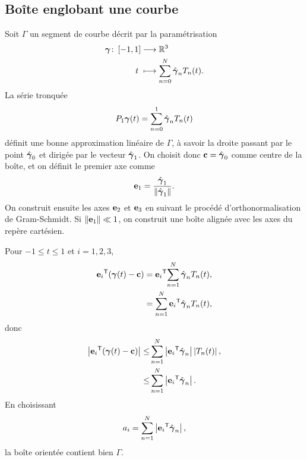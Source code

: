 \subsection{Boîte englobant une courbe}
Soit $\Gamma$ un segment de courbe décrit par la paramétrisation 
\begin{align}
  \boldsymbol{\gamma} \colon \left[ -1, 1 \right] &\longrightarrow \mathbb{R}^3 \nonumber \\
  t\; &\longmapsto \sum_{n=0}^{N} \hat{\boldsymbol{\gamma}}_n T_n(t).
\end{align}
%
La série tronquée
\begin{equation}
	P_{1}{\boldsymbol{\gamma}}(t) = \sum_{n=0}^{1} \hat{\boldsymbol{\gamma}}_n T_n(t)
\end{equation}
définit une bonne approximation linéaire de $\Gamma$, à savoir la droite passant par le point $\hat{\boldsymbol{\gamma}}_0$ et dirigée par le vecteur $\hat{\boldsymbol{\gamma}}_1$. 
On choisit donc $\mathbf{c} = \hat{\boldsymbol{\gamma}}_0$ comme centre de la boîte, et on définit le premier axe comme
\begin{equation}
	\mathbf{e}_1 = \frac{\hat{\boldsymbol{\gamma}}_1}{\left\| {\hat{\boldsymbol{\gamma}}_1} \right\|}.
\end{equation}
On construit ensuite les axes $\mathbf{e}_2$ et $\mathbf{e}_3$ en suivant le procédé d'orthonormalisation de Gram-Schmidt. Si $\left\| {\mathbf{e}_1} \right\| \ll 1$, on construit une boîte alignée avec les axes du repère cartésien.
\par
Pour $-1 \leq t \leq 1$ et $i=1,2,3$,
\begin{align*}
	{\mathbf{e}_i} ^\mathsf{T} {\left( \boldsymbol{\gamma}(t) - \mathbf{c} \right)} 
	&= {\mathbf{e}_i} ^\mathsf{T} {\sum_{n=1}^{N} \hat{\boldsymbol{\gamma}}_n T_n(t)} ,\\
	&= \sum_{n=1}^{N}{\mathbf{e}_i} ^\mathsf{T} {\hat{\boldsymbol{\gamma}}_n} T_n(t),
\end{align*}
donc
\begin{align*}
	\left| {\mathbf{e}_i} ^\mathsf{T} {\left( \boldsymbol{\gamma}(t) - \mathbf{c} \right)} \right| 
	\leq& \sum_{n=1}^{N} \left|{\mathbf{e}_i} ^\mathsf{T} {\hat{\boldsymbol{\gamma}}_n}\right| \left| T_n(t) \right|,\\
	\leq& \sum_{n=1}^{N} \left|{\mathbf{e}_i} ^\mathsf{T} {\hat{\boldsymbol{\gamma}}_n}\right|.
\end{align*}
En choisissant
\begin{equation}
	a_i = \sum_{n=1}^{N} \left|{\mathbf{e}_i} ^\mathsf{T} {\hat{\boldsymbol{\gamma}}_n}\right|,
\end{equation}
la boîte orientée contient bien $\Gamma$.


